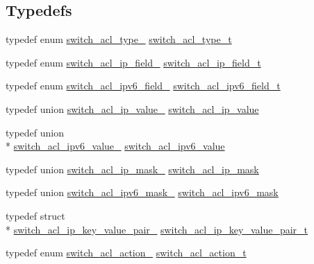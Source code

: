\subsection*{Typedefs}
\begin{DoxyCompactItemize}
\item 
typedef enum \hyperlink{group__ACL_ga38651cb44573d362748840ec5c930d5a}{switch\+\_\+acl\+\_\+type\+\_\+} \hyperlink{group__ACL_ga01c3d85a9624b16e65bc9272f210e961}{switch\+\_\+acl\+\_\+type\+\_\+t}
\item 
typedef enum \hyperlink{group__ACL_gace4560f87e18ccd1d8f9119fe7900fa1}{switch\+\_\+acl\+\_\+ip\+\_\+field\+\_\+} \hyperlink{group__ACL_gace0502c1033d71f9f41503531d259a19}{switch\+\_\+acl\+\_\+ip\+\_\+field\+\_\+t}
\item 
typedef enum \hyperlink{group__ACL_ga129df7ad73db6209bc9a5f28696408db}{switch\+\_\+acl\+\_\+ipv6\+\_\+field\+\_\+} \hyperlink{group__ACL_gac21b1f90cca1d5f3305169407ebfd0ed}{switch\+\_\+acl\+\_\+ipv6\+\_\+field\+\_\+t}
\item 
typedef union \hyperlink{unionswitch__acl__ip__value__}{switch\+\_\+acl\+\_\+ip\+\_\+value\+\_\+} \hyperlink{group__ACL_ga6a198102b6c0fc0043f5486f85870dfa}{switch\+\_\+acl\+\_\+ip\+\_\+value}
\item 
typedef union \\*
\hyperlink{unionswitch__acl__ipv6__value__}{switch\+\_\+acl\+\_\+ipv6\+\_\+value\+\_\+} \hyperlink{group__ACL_ga05073406ded139965f11ef74332add10}{switch\+\_\+acl\+\_\+ipv6\+\_\+value}
\item 
typedef union \hyperlink{unionswitch__acl__ip__mask__}{switch\+\_\+acl\+\_\+ip\+\_\+mask\+\_\+} \hyperlink{group__ACL_ga1a194b7137a5eebe4941a321815f4263}{switch\+\_\+acl\+\_\+ip\+\_\+mask}
\item 
typedef union \hyperlink{unionswitch__acl__ipv6__mask__}{switch\+\_\+acl\+\_\+ipv6\+\_\+mask\+\_\+} \hyperlink{group__ACL_ga598339272a82061bf0816da6e067f505}{switch\+\_\+acl\+\_\+ipv6\+\_\+mask}
\item 
typedef struct \\*
\hyperlink{structswitch__acl__ip__key__value__pair__}{switch\+\_\+acl\+\_\+ip\+\_\+key\+\_\+value\+\_\+pair\+\_\+} \hyperlink{group__ACL_gac532e149a15c4dc5b3b405a03f884725}{switch\+\_\+acl\+\_\+ip\+\_\+key\+\_\+value\+\_\+pair\+\_\+t}
\item 
typedef enum \hyperlink{group__ACL_ga55dd1b7b278fc8fe549b0025fd93837c}{switch\+\_\+acl\+\_\+action\+\_\+} \hyperlink{group__ACL_ga9e512fe793010aac7829bb2fbef4764d}{switch\+\_\+acl\+\_\+action\+\_\+t}

\end{DoxyCompactItemize}
